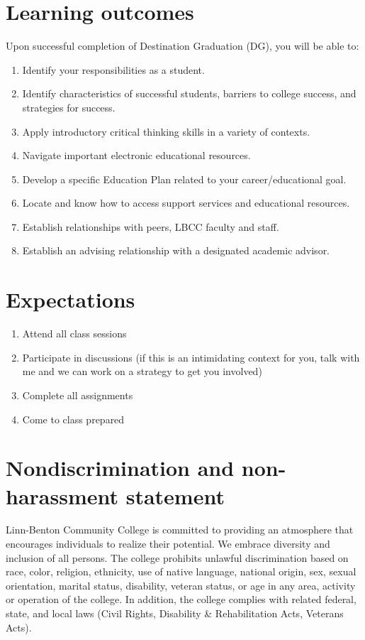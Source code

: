 \documentclass[12pt,article,oneside]{memoir}
\begin{document}
\section{Learning outcomes}
Upon successful completion of Destination Graduation (DG), you will be able to:
\begin{enumerate}
 \item Identify your responsibilities as a student.
 \item Identify characteristics of successful students, barriers to college success, and strategies for success.
 \item Apply introductory critical thinking skills in a variety of contexts.
 \item Navigate important electronic educational resources. 
 \item Develop a specific Education Plan related to your career/educational goal.
 \item Locate and know how to access support services and educational resources.
 \item Establish relationships with peers, LBCC faculty and staff.
 \item Establish an advising relationship with a designated academic advisor.
\end{enumerate}

\section{Expectations}
\begin{enumerate}
 \item Attend all class sessions
 \item Participate in discussions (if this is an intimidating context for you, talk with me and we can work on a strategy to get you involved)
 \item Complete all assignments
 \item Come to class prepared
\end{enumerate}


\section{Nondiscrimination and non-harassment statement}

Linn-Benton Community College is committed to providing an atmosphere that  encourages individuals to realize their potential. We embrace diversity and inclusion of all persons. The college prohibits unlawful discrimination based on race, color, religion, ethnicity, use of native language, national origin, sex, sexual orientation, marital status, disability, veteran status, or age in any area, activity or operation of the college. In addition, the college complies with related federal, state, and local laws (Civil Rights, Disability \& Rehabilitation Acts, Veterans Acts).
\end{document}
